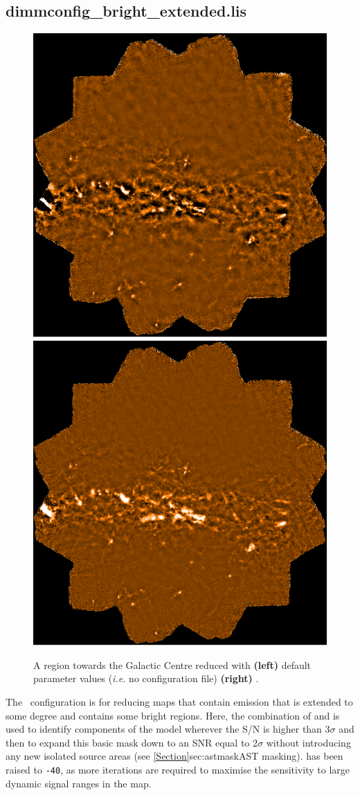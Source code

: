 \subsection{dimmconfig\_bright\_extended.lis}

\begin{figure}[t!]
\includegraphics[width=0.47\linewidth]{sc21_gal_def}
\hspace{3mm}
\includegraphics[width=0.47\linewidth]{sc21_gal_brex}
\caption[Example map reduced with
  ]
   {A region towards the Galactic Centre reduced with \textbf{(left)}
   default parameter values (\emph{i.e.} no configuration file) \textbf{(right)}
   .\label{fig:becompare}}
\end{figure}

The \brightextended\ configuration is for reducing maps that contain
emission that is extended to some degree and contains some bright
regions. Here, the combination of 
and  is used to identify components of
the  model wherever the S/N is higher than 3$\sigma$ and then
to expand this basic mask down to an SNR equal to 2$\sigma$ without introducing
any new isolated source areas (see \cref{Section}{sec:astmask}{AST masking}).
 has been raised to \texttt{-40}, as more iterations are
required to maximise the sensitivity to large dynamic signal ranges in the map.

